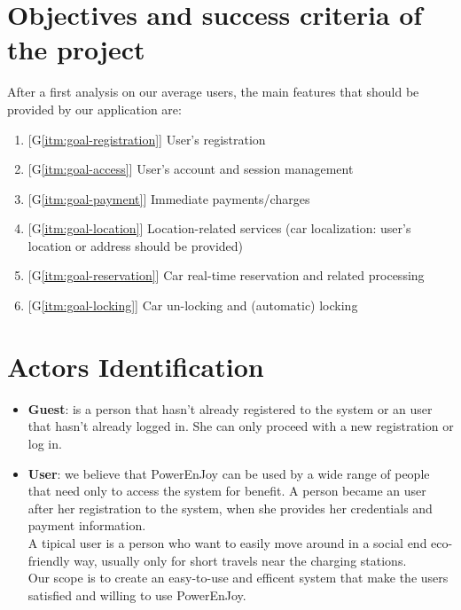 \section{Objectives and success criteria of the project}
\label{sec: proj_objectives}
After a first analysis on our average users, the main features that should be provided by our application are:
\begin{enumerate}
	\item{[G\ref{itm:goal-registration}] User's registration}\label{itm:goal-registration} %
	\item{[G\ref{itm:goal-access}] User's account and session management}\label{itm:goal-access}
	\item{[G\ref{itm:goal-payment}] Immediate payments/charges}\label{itm:goal-payment} %
	\item{[G\ref{itm:goal-location}] Location-related services (car localization: user's location or address should be provided)}\label{itm:goal-location}
	\item{[G\ref{itm:goal-reservation}] Car real-time reservation and related processing}\label{itm:goal-reservation}
	\item{[G\ref{itm:goal-locking}] Car un-locking and (automatic) locking}\label{itm:goal-locking} %
\end{enumerate}

\section{Actors Identification}
\begin{itemize}
	\item{{\bf Guest}: is a person that hasn't already registered to the system or an user that hasn't already logged in. She can only proceed with a new registration or log in.}
	\item{{\bf User}: we believe that PowerEnJoy can be used by a wide range of people that need only to access the system for benefit. A person became an user after her registration to the system, when she provides her credentials and payment information. 
	\\A tipical user is a person who want to easily move around in a social end eco-friendly way, usually only for short travels near the \glspl{charging station}.
	\\Our scope is to create an easy-to-use and efficent system that make the users satisfied and willing to use PowerEnJoy.}
\end{itemize}

